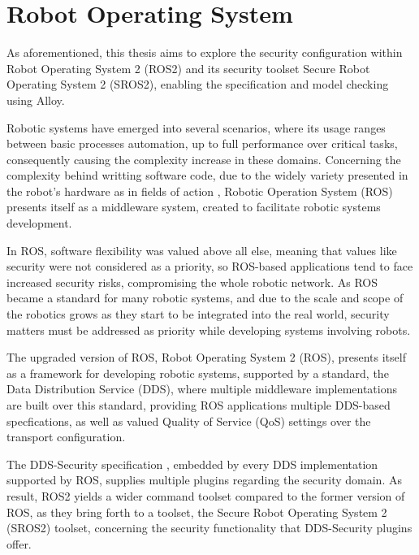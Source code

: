 \chapter{Robot Operating System}\label{c:ros}

As aforementioned, this thesis aims to explore the security configuration within Robot Operating System 2 (ROS2) and its security toolset Secure Robot Operating System 2 (SROS2), enabling the specification and model checking using Alloy. 


Robotic systems have emerged into several scenarios, where its usage ranges between basic processes automation, up to full performance over critical tasks, consequently causing the complexity increase in these domains. Concerning the complexity behind writting software code, due to the widely variety presented in the robot's hardware as in fields of action \cite{cousins2011exponential}, Robotic Operation System (ROS) presents itself as a middleware system, created to facilitate robotic systems development.

In ROS, software flexibility was valued above all else, meaning that values like security were not considered as a priority, so ROS-based applications tend to face increased security risks, compromising the whole robotic network. As ROS became a standard for many robotic systems, and due to the scale and scope of the robotics grows as they start to be integrated into the real world, security matters must be addressed as priority while developing systems involving robots. \cite{diluoffo2018robot, kim2018security}

The upgraded version of ROS, Robot Operating System 2 (ROS), presents itself as a framework for developing robotic systems, supported by a standard, the Data Distribution Service (DDS), where multiple middleware implementations are built over this standard, providing ROS applications multiple DDS-based specfications, as well as valued Quality of Service (QoS) settings over the transport configuration. 

The DDS-Security specification \cite{dds-s}, embedded by every DDS implementation supported by ROS, supplies multiple plugins regarding the security domain. As result, ROS2 yields a wider command toolset compared to the former version of ROS, as they bring forth to a toolset, the Secure Robot Operating System 2 (SROS2) toolset, concerning the security functionality that DDS-Security plugins offer.


